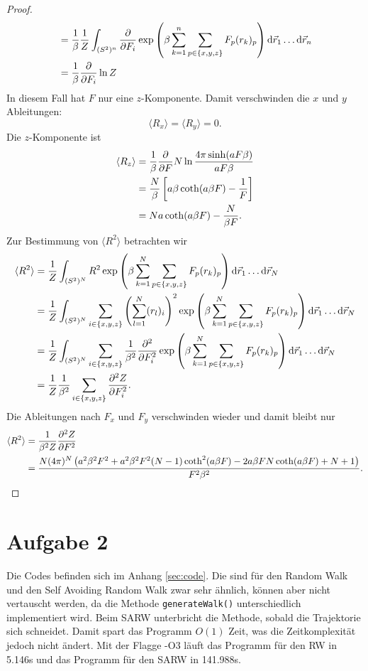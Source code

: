 \documentclass[prb,12pt]{revtex4-2}
\theoremstyle{definition}
\theoremstyle{definition}
\begin{document}
\begin{proof}
\begin{align*}
	&=\frac 1\beta \frac 1Z \int_{(S^2)^n} \pdv{F_i} \exp\left(\beta \sum_{k=1}^n \sum_{p\in \{x,y,z\}} F_p (r_k)_p\right)\dd{\vec{r}_1}\dots \dd{\vec{r}_n}\\
	&= \frac 1\beta \pdv{F_i}\ln Z
\end{align*}
In diesem Fall hat $F$ nur eine $z$-Komponente. Damit verschwinden die $x$ und $y$ Ableitungen:
\[\langle R_x \rangle = \langle R_y \rangle = 0.\]
Die $z$-Komponente ist
\begin{align*}
	\langle R_z \rangle &= \frac 1\beta \pdv{F} N \ln \frac{4\pi \sinh (a F \beta)}{a F \beta}\\
	&=\frac{N}{\beta} \left[a \beta  \coth (a \beta  F)-\frac{1}{F}\right]\\
	&=Na \coth (a \beta F) - \frac{N}{\beta F}.
\end{align*}
Zur Bestimmung von $\langle R^2\rangle$ betrachten wir
\begin{align*}
	\langle R^2\rangle &= \frac 1Z \int_{(S^2)^N} R^2 \exp\left(\beta \sum_{k=1}^N \sum_{p\in \{x,y,z\}} F_p (r_k)_p\right)\dd{\vec{r}_1}\dots \dd{\vec{r}_N}\\
	&=  \frac 1Z \int_{(S^2)^N}  \sum_{i\in \{x,y,z\}}\left(\sum_{l=1}^N (r_l)_i\right)^2  \exp\left(\beta \sum_{k=1}^N \sum_{p\in \{x,y,z\}} F_p (r_k)_p\right)\dd{\vec{r}_1}\dots \dd{\vec{r}_N}\\
	&= \frac 1Z \int_{(S^2)^N}  \sum_{i\in \{x,y,z\}}\frac{1}{\beta^2}\pdv[2]{F_i} \exp\left(\beta \sum_{k=1}^N \sum_{p\in \{x,y,z\}} F_p (r_k)_p\right)\dd{\vec{r}_1}\dots \dd{\vec{r}_N}\\
	&= \frac 1Z \frac{1}{\beta^2}\sum_{i\in \{x,y,z\}}\pdv[2]{Z}{F_i}.
\end{align*}
Die Ableitungen nach $F_x$ und $F_y$ verschwinden wieder und damit bleibt nur
\begin{align*}
\langle R^2\rangle &= \frac 1{\beta^2 Z}\pdv[2]{Z}{F}\\
&=\frac{N (4 \pi )^N\left(a^2 \beta ^2 F^2+a^2 \beta ^2 F^2 (N-1) \coth ^2(a \beta  F)-2 a \beta  F N \coth (a \beta  F)+N+1\right)}{F^2\beta^2}.\qedhere
\end{align*}
\end{proof}
\section{Aufgabe 2}
Die Codes befinden sich im Anhang \ref{sec:code}. Die sind für den Random Walk und den Self Avoiding Random Walk zwar sehr ähnlich, können aber nicht vertauscht werden, da die Methode \texttt{generateWalk()} unterschiedlich implementiert wird. Beim SARW unterbricht die Methode, sobald die Trajektorie sich schneidet. Damit spart das Programm $O(1)$ Zeit, was die Zeitkomplexität jedoch nicht ändert. Mit der Flagge -O3 läuft das Programm für den RW in 5.146s und das Programm für den SARW in 141.988s.
\end{document}
